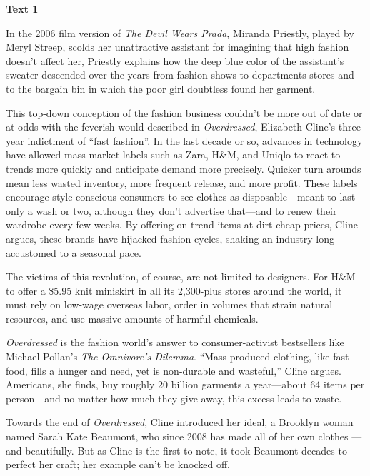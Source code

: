 
\begin{center}\textbf{Text 1}\end{center}

\qquad In the 2006 film version of \emph{The Devil Wears Prada}, Miranda Priestly, played by Meryl Streep, scolds her unattractive assistant for imagining that high fashion doesn't affect her, Priestly explains how the deep blue color of the assistant's sweater descended over the years from fashion shows to departments stores and to the bargain bin in which the poor girl doubtless found her garment.

\qquad This top-down conception of the fashion business couldn't be more out of date or at odds with the feverish would described in \emph{Overdressed}, Elizabeth Cline's three-year \ul{indictment} of ``fast fashion''. In the last decade or so, advances in technology have allowed mass-market labels such as Zara, H\&M, and Uniqlo to react to trends more quickly and anticipate demand more precisely. Quicker turn arounds mean less wasted inventory, more frequent release, and more profit. These labels encourage style-conscious consumers to see clothes as disposable---meant to last only a wash or two, although they don't advertise that---and to renew their wardrobe every few weeks. By offering on-trend items at dirt-cheap prices, Cline argues, these brands have hijacked fashion cycles, shaking an industry long accustomed to a seasonal pace.

\qquad The victims of this revolution, of course, are not limited to designers. For H\&M to offer a \$5.95 knit miniskirt in all its 2,300-plus stores around the world, it must rely on low-wage overseas labor, order in volumes that strain natural resources, and use massive amounts of harmful chemicals.

\qquad \emph{Overdressed} is the fashion world's answer to consumer-activist bestsellers like Michael Pollan's \emph{The Omnivore's Dilemma}. ``Mass-produced clothing, like fast food, fills a hunger and need, yet is non-durable and wasteful,'' Cline argues. Americans, she finds, buy roughly 20 billion garments a year---about 64 items per person---and no matter how much they give away, this excess leads to waste.

\qquad Towards the end of \emph{Overdressed}, Cline introduced her ideal, a Brooklyn woman named Sarah Kate Beaumont, who since 2008 has made all of her own clothes --- and beautifully. But as Cline is the first to note, it took Beaumont decades to perfect her craft; her example can't be knocked off.

